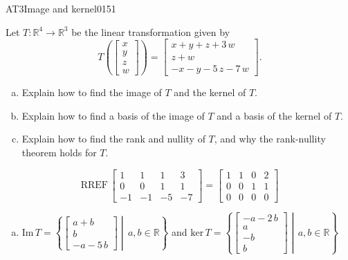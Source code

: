 \begin{exercise}{AT3}{Image and kernel}{0151} 
\begin{exerciseStatement} 

 Let \(T:\mathbb{R}^4 \to \mathbb{R}^3\) be the linear transformation given by \[T\left( \left[\begin{array}{c}
x \\
y \\
z \\
{w}
\end{array}\right] \right) = \left[\begin{array}{c}
x + y + z + 3 \, {w} \\
z + {w} \\
-x - y - 5 \, z - 7 \, {w}
\end{array}\right].\] 

 

\begin{enumerate}[(a)]
\item Explain how to find the image of \(T\) and the kernel of \(T\).
\item Explain how to find a basis of the image of \(T\) and a basis of the kernel of \(T\).
\item Explain how to find the rank and nullity of \(T\), and why the rank-nullity theorem holds for \(T\).
\end{enumerate}

     \end{exerciseStatement}
 \begin{exerciseAnswer} 

\[\mathrm{RREF}\,\left[\begin{array}{cccc}
1 & 1 & 1 & 3 \\
0 & 0 & 1 & 1 \\
-1 & -1 & -5 & -7
\end{array}\right]=\left[\begin{array}{cccc}
1 & 1 & 0 & 2 \\
0 & 0 & 1 & 1 \\
0 & 0 & 0 & 0
\end{array}\right]\]

 

\begin{enumerate}[(a)]
\item  

 \(\mathrm{Im}\,T =  \left\{ \left[\begin{array}{c}
a + b \\
b \\
-a - 5 \, b
\end{array}\right] \middle|\,a,b\in\mathbb{R}\right\}\) and \(\mathrm{ker}\,T = \left\{ \left[\begin{array}{c}
-a - 2 \, b \\
a \\
-b \\
b
\end{array}\right] \middle|\,a,b\in\mathbb{R}\right\}\) 


\end{enumerate}
\end{exerciseAnswer}
\end{exercise}
